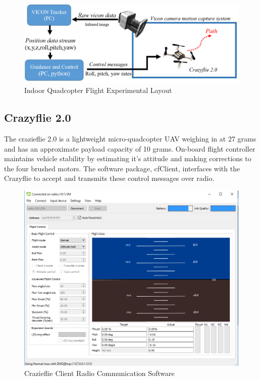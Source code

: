 \documentclass[numbered,pdftex]{ohio-etd}
\begin{document}
\begin{figure}
	\centering
	\includegraphics[trim=0 0 0 0,clip,width=15cm]{PaperFigures/Methods/experimentalSetup}
	\caption{Indoor Quadcopter Flight Experimental Layout}
	\label{fig:experimentalFramework}
\end{figure}

\subsection{Crazyflie 2.0}
The crazieflie 2.0 is a lightweight micro-quadcopter UAV weighing in at 27 grams and has an approximate payload capacity of 10 grams. On-board flight controller maintains vehicle stability by estimating it's attitude and making corrections to the four brushed motors. The software package, cfClient, interfaces with the Crazyflie to accept and transmits these control messages over radio. 


\begin{figure}[H]
	\centering
	\includegraphics[trim=0 0 0 0,clip,width=12cm]{PaperFigures/Methods/cfClient}
	\caption{Crazieflie Client Radio Communication Software}
	\label{fig:cfClient}
\end{figure}
\end{document}
